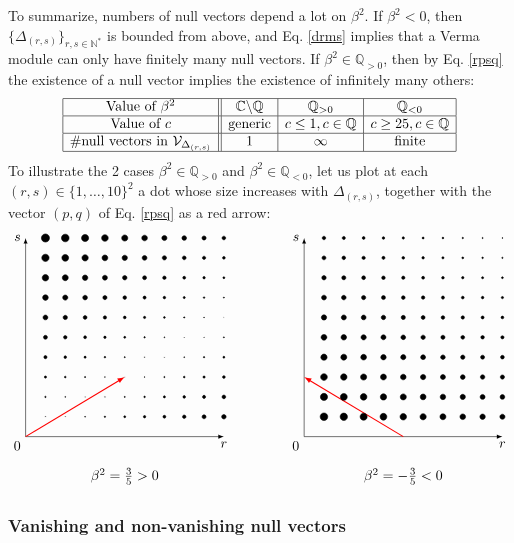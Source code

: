 \documentclass[12pt, a4paper]{article}
\begin{document}
To summarize, numbers of null vectors depend a lot on $\beta^2$. If $\beta^2<0$, then $\{\Delta_{(r, s)}\}_{r,s\in\mathbb{N}^*}$ is bounded from above, and Eq. \eqref{drms} implies that a Verma module can only have finitely many null vectors. If $\beta^2\in \mathbb{Q}_{>0}$, then by Eq. \eqref{rpsq} the existence of a null vector implies the existence of infinitely many others: 
\begin{align}
 \begin{array}{|c||c|c|c|}
  \hline 
  \text{Value of }\beta^2 & \mathbb{C}\backslash \mathbb{Q} & \mathbb{Q}_{>0} & \mathbb{Q}_{<0}
  \\
  \hline 
  \text{Value of }c & \text{generic} & c\leq 1 , c\in\mathbb{Q} &  c\geq 25, c\in\mathbb{Q}
  \\
  \hline 
  \#\text{null vectors in } \mathcal{V}_{\Delta_{(r, s)}} & 1 & \infty & \text{finite} 
  \\
  \hline 
 \end{array}
\end{align}
To illustrate the 2 cases $\beta^2\in \mathbb{Q}_{>0}$ and $\beta^2\in \mathbb{Q}_{<0}$, let us plot at each $(r,s)\in \{1,\dots, 10\}^2$ a dot whose size increases with 
$\Delta_{(r,s)}$, together with the vector $(p, q)$ of Eq. \eqref{rpsq} as a red arrow:
\begin{align}
 \begin{tikzpicture}[baseline=(base), scale = .5]
 \coordinate (base) at (0, 4);
  \draw[latex-latex] (0, 10) node [left] {$s$} -- (0, 0) node[below left] {$0$} -- (10, 0) node [below] {$r$};
  \draw[thick, red, -latex] (0, 0) -- (5, 3);
  \foreach \r in {1,...,10}{
  \foreach \s in {1,...,10}{
  \pgfmathsetmacro{\myrad}{.2+.12*abs(3*\r-5*\s)}
  \filldraw (\r, \s) circle [radius = \myrad pt];
  }}
  \node at (5, -2) {$\beta^2 = \frac35>0$};
 \end{tikzpicture}
 \qquad \qquad
 \begin{tikzpicture}[baseline=(base), scale = .5]
 \coordinate (base) at (0, 4);
  \draw[latex-latex] (0, 10) node [left] {$s$} -- (0, 0) node[below left] {$0$} -- (10, 0) node [below] {$r$};
  \draw[thick, red, -latex] (5, 0) -- (0, 3);
  \foreach \r in {1,...,10}{
  \foreach \s in {1,...,10}{
  \pgfmathsetmacro{\myrad}{6-(3*\r+5*\s)/15}
  \filldraw (\r, \s) circle [radius = \myrad pt];
  }}
  \node at (5, -2) {$\beta^2 = -\frac35<0$};
 \end{tikzpicture}
\end{align}

\subsubsection{Vanishing and non-vanishing null vectors}
\end{document}
